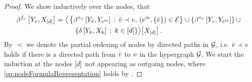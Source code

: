 \begin{proof}
    We show inductively over the nodes, that
    \begin{align}
        \label{eq:nodeFormulaRepresentation}
        \beta^{f_{v}}\left[Y_{v},X_{[d]}\right]
        = \big\langle 
            &\left\{
            \beta^{\circ_{\bar{v}}}\left[Y_{\bar{v}},Y_{e^{\mathrm{in}}}\right] \,:\, \bar{v}\prec v ,\, (e^{\mathrm{in}},\{\bar{v}\})\in\mathcal{E}
            \right\} \cup \left\{\beta^{\circ_{v}}\left[Y_{v},Y_{e^{\mathrm{in}}}\right]\right\}  \cup \\
            & \quad \{\delta\left[Y_{k},X_{k}\right] \,:\, k\in[d]\}
         \big\rangle \big[ X_{[d]} \big] \, .
    \end{align}
    By $\prec$ we denote the partial ordering of nodes by directed paths in $\mathcal{G}$, i.e. $\bar{v} \prec v$ holds if there is a directed path from $\bar{v}$ to $v$ in the hypergraph $\mathcal{G}$.
    We start the induction at the nodes $[d]$ not appearing as outgoing nodes, where \eqref{eq:nodeFormulaRepresentation} holds by .



\end{proof}
